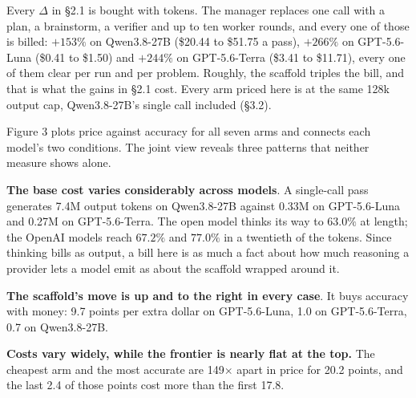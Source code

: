 \documentclass[11pt]{article}
\begin{document}
Every $\Delta$ in \S2.1 is bought with tokens. The manager replaces one call with a plan,
a brainstorm, a verifier and up to ten worker rounds, and every one of those is billed:
$+153\%$ on Qwen3.8-27B (\$20.44 to \$51.75 a pass), $+266\%$ on GPT-5.6-Luna
(\$0.41 to \$1.50) and $+244\%$ on GPT-5.6-Terra (\$3.41 to \$11.71), every one of them
clear per run and per problem. Roughly, the scaffold triples the bill, and that is what
the gains in \S2.1 cost. Every arm priced here is at the same 128k output cap, Qwen3.8-27B's
single call included (\S3.2).

%






\FloatBarrier

Figure 3 plots price against accuracy for all seven arms and connects each model's two
conditions. The joint view reveals three patterns that neither measure shows alone.

\textbf{The base cost varies considerably across models}.
A single-call pass generates 7.4M output tokens on Qwen3.8-27B against 0.33M
on GPT-5.6-Luna and 0.27M on GPT-5.6-Terra. The open model thinks its way to $63.0\%$ at
length; the OpenAI models reach $67.2\%$ and $77.0\%$ in a twentieth of the tokens. Since
thinking bills as output, a bill here is as much a fact about how much reasoning a provider
lets a model emit as about the scaffold wrapped around it.

\textbf{The scaffold's move is up and to the right in every case}. It buys accuracy with money: 9.7 points per extra dollar on GPT-5.6-Luna,
1.0 on GPT-5.6-Terra, 0.7 on Qwen3.8-27B.

\textbf{Costs vary widely, while the frontier is nearly flat at the top.} The cheapest arm and
the most accurate are 149$\times$ apart in price for 20.2 points, and the last 2.4 of those
points cost more than the first 17.8.
\end{document}
